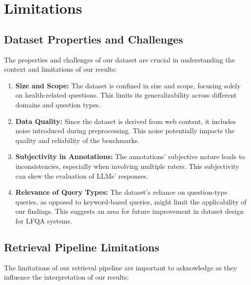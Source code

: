 
\chapter{Limitations}\label{limitations}


\section{Dataset Properties and Challenges}

The properties and challenges of our dataset are crucial in understanding the context and limitations of our results:

\begin{enumerate}
    \item \textbf{Size and Scope:} The dataset is confined in size and scope, focusing solely on health-related questions. This limits its generalizability across different domains and question types.
    \item \textbf{Data Quality:} Since the dataset is derived from web content, it includes noise introduced during preprocessing. This noise potentially impacts the quality and reliability of the benchmarks.
    \item \textbf{Subjectivity in Annotations:} The annotations' subjective nature leads to inconsistencies, especially when involving multiple raters. This subjectivity can skew the evaluation of LLMs' responses.
    \item \textbf{Relevance of Query Types:} The dataset's reliance on question-type queries, as opposed to keyword-based queries, might limit the applicability of our findings. This suggests an area for future improvement in dataset design for LFQA systems.
\end{enumerate}

\section{Retrieval Pipeline Limitations}

The limitations of our retrieval pipeline are important to acknowledge as they influence the interpretation of our results:

